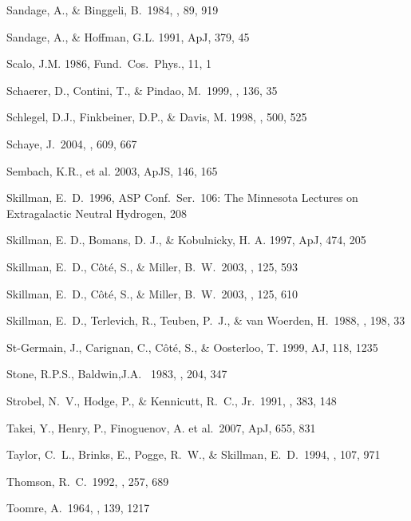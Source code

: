 \documentclass[12pt,preprint]{emulateapj}
\begin{document}
\begin{thebibliography}{}
Sandage, A., \& Binggeli, B.\ 1984, \aj, 89, 919

Sandage, A., \& Hoffman, G.L. 1991, ApJ, 379, 45

Scalo, J.M. 1986, Fund.\ Cos.\ Phys., 11, 1

Schaerer, D., Contini, T., \& Pindao, M.\ 1999, \aaps, 136, 35 

Schlegel, D.J., Finkbeiner, D.P., \& Davis, M. 1998, \apj , 500, 525

Schaye, J.\ 2004, \apj, 609, 667 

Sembach, K.R., et al. 2003, ApJS, 146, 165

Skillman, E.~D.\ 1996, ASP Conf.~Ser.~106: 
The Minnesota Lectures on Extragalactic Neutral Hydrogen, 208 

Skillman, E. D., Bomans, D. J., \& Kobulnicky, H. A.  
1997, ApJ, 474, 205

Skillman, E.~D., C{\^o}t{\'e}, S., \& Miller, B.~W.\ 2003, \aj, 125, 593

Skillman, E.~D., C{\^o}t{\'e}, S., \& Miller, B.~W.\ 2003, \aj, 125, 610 

Skillman, E.~D., Terlevich, R., Teuben, P.~J., \& van Woerden, H.\ 1988, \aap, 198, 33 

St-Germain, J., Carignan, C., C\^ot\'e, S., \& Oosterloo, T. 1999, AJ, 118, 1235

Stone, R.P.S., Baldwin,J.A. \ 1983, \mnras, 204, 347

Strobel, N.~V., Hodge, P., \& Kennicutt, R.~C., Jr.\ 1991, \apj, 383, 148 

Takei, Y., Henry, P., Finoguenov, A. et al.\ 2007, ApJ, 655, 831 

Taylor, C.~L., Brinks, E., Pogge, R.~W., \& Skillman, E.~D.\ 1994, \aj, 107, 971 

Thomson, R.~C.\ 1992, \mnras, 257, 689 

Toomre, A.\ 1964, \apj, 139, 1217 


\end{thebibliography}
\end{document}
